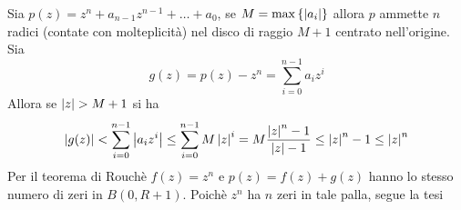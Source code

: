 \begin{cor}\bianco
Sia $p(z) = z^n + a_{n-1} z^{n-1} +\dots + a_0$, se $M= \max\left\{ \left\vert a_i \right\vert \right\}$ allora $p$ ammette $n$ radici (contate con molteplicit\`a) nel disco di raggio $M+1$ centrato nell'origine.
\proof Sia 
$$g(z) = p(z) - z^n = \sum_{i=0}^{n-1} a_i z^i$$ 
Allora se $\left\vert z \right\vert > M+1$ si ha 
$$ \left\vert g(z) \right\vert < \sum_{i=0}^{n-1} \left\vert a_i z^i \right\vert \leq \sum_{i=0}^{n-1} M \left\vert z \right\vert^i = M \frac{\left\vert z \right\vert^n -1}{\left\vert z \right\vert -1} \leq \left\vert z \right\vert ^n -1 \leq \left\vert z \right\vert^n$$
Per il teorema di Rouch\`e $f(z)= z^n$ e $p(z) = f(z) + g(z)$ hanno lo stesso numero di zeri in $B(0, R+1)$. Poich\`e $z^n$ ha $n$ zeri in  tale palla, segue la tesi 
\end{cor}
